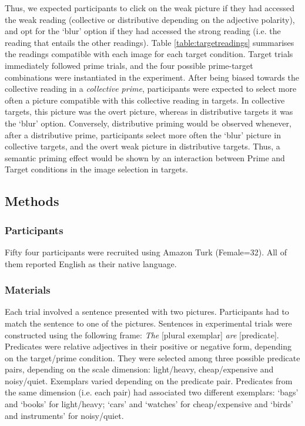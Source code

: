\documentclass[a4paper, 11pt]{article}
\begin{document}
Thus, we expected participants to click on the weak picture if they had accessed the weak reading (collective or distributive depending on the adjective polarity), and opt for the `blur' option if they had accessed the strong reading (i.e. the reading that entails the other readings). Table \ref{table:targetreadings} summarises the readings compatible with each image for each target condition. Target trials immediately followed prime trials, and the four possible prime-target combinations were instantiated in the experiment. 
After being biased towards the collective reading in a \textit{collective prime}, participants were expected to select more often a picture compatible with this collective reading in targets. In collective targets, this picture was the overt picture, whereas in distributive targets it was the `blur' option. Conversely, distributive priming would be observed whenever, after a distributive prime, participants select more often the `blur' picture in collective targets, and the overt weak picture in distributive targets.  Thus, a semantic priming effect would be shown by an interaction between Prime and Target conditions in the image selection in targets.  

\subsection{Methods}

\subsubsection{Participants}
Fifty four participants were recruited using Amazon Turk (Female=32). All of them reported English as their native language. 

\subsubsection{Materials}
Each trial involved a sentence presented with two pictures. Participants had to match the sentence to one of the pictures.
Sentences in experimental trials were constructed using the following frame: \textit{The} [plural exemplar] \textit{are} [predicate].
Predicates were relative adjectives in their positive or negative form, depending on the target/prime condition. They were selected among three possible predicate pairs, depending on the scale dimension: light/heavy, cheap/expensive and noisy/quiet. 
Exemplars varied depending on the predicate pair. Predicates from the same dimension (i.e. each pair) had associated two different exemplars: `bags' and `books' for light/heavy; `cars' and `watches' for cheap/expensive and `birds' and instruments' for noisy/quiet. 
\end{document}
